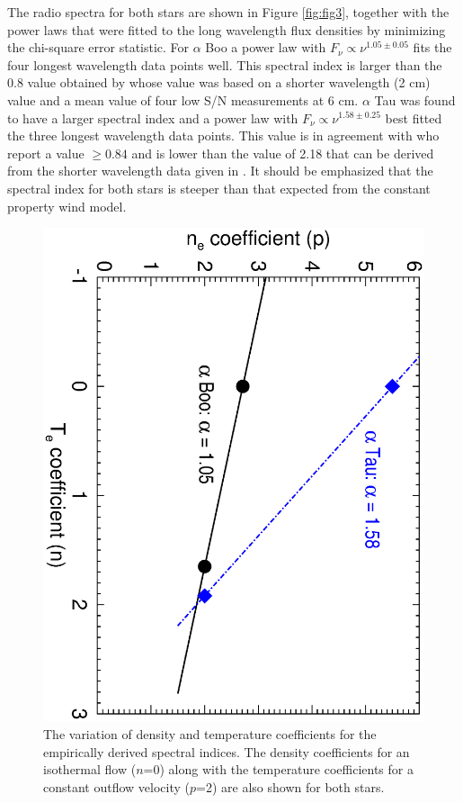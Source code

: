 \documentclass[iop]{emulateapj}
\begin{document}
The radio spectra for both stars are shown in Figure \ref{fig:fig3}, together with the power laws that were fitted to the long wavelength flux densities by minimizing the chi-square error statistic. For $\alpha$ Boo a power law with $F_{\nu} \propto \nu ^{1.05 \pm 0.05}$ fits the four longest wavelength data points well. This spectral index is larger than the 0.8 value obtained by \cite{1986AJ.....91..602D} whose value was based on a shorter wavelength (2 cm) value and a mean value of four low S/N measurements at 6 cm. $\alpha$ Tau was found to have a larger spectral index and a power law with $F_{\nu} \propto \nu ^{1.58 \pm 0.25}$ best fitted the three longest wavelength data points. This value is in agreement with \cite{1986AJ.....91..602D} who report a value $\ge 0.84$ and is lower than the value of 2.18 that can be derived from the shorter wavelength data given in \cite{2007ApJ...655..946W}. It should be emphasized that the spectral index for both stars is steeper than that expected from the constant property wind model. 

\begin{figure}
\includegraphics[trim = 0mm 11mm 10mm 21mm, clip,scale=0.4,angle=90]{fig4.ps}
\caption{The variation of density and temperature coefficients for the empirically derived spectral indices. The density coefficients for an isothermal flow ($n$=0) along with the temperature coefficients for a constant outflow velocity ($p$=2) are also shown for both stars.}
\label{fig:fig4}
\end{figure}
\end{document}
